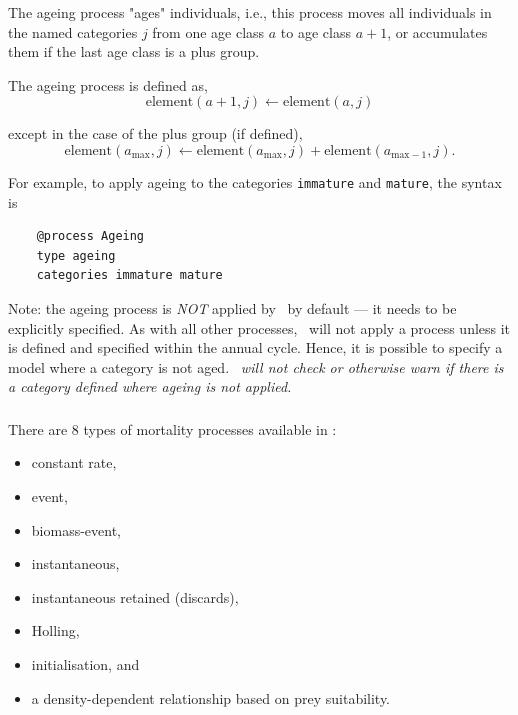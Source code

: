 The ageing process "ages" individuals, i.e., this process moves all individuals in the named categories $j$ from one age class $a$ to age class $a + 1$, or accumulates them if the last age class is a plus group.

The ageing process is defined as,
\begin{equation}
  \text{element}(a + 1,j) \leftarrow \text{element}(a,j)
\end{equation}

except in the case of the plus group (if defined),
\begin{equation}
  \text{element}(a_{\text{max}}, j) \leftarrow \text{element}(a_{\text{max}}, j) + \text{element}(a_{\text{max}-1}, j).
\end{equation}

For example, to apply ageing to the categories \texttt{immature} and \texttt{mature}, the syntax is

{\small{\begin{verbatim}
	@process Ageing
	type ageing
	categories immature mature
	\end{verbatim}}}

Note: the ageing process is \emph{NOT} applied by \CNAME\ by default --- it needs to be explicitly specified. As with all other processes, \CNAME\ will not apply a process unless it is defined and specified within the annual cycle. Hence, it is possible to specify a model where a category is not aged. \emph{\CNAME\ will not check or otherwise warn if there is a category defined where ageing is not applied.}

\subsubsection{\label{sec:Process-Mortality}}

There are 8 types of mortality processes available in \CNAME:

\begin{itemize}
	\item constant rate,
	\item event,
	\item biomass-event,
	\item instantaneous,
	\item instantaneous retained (discards),
	\item Holling,
	\item initialisation, and
	\item a density-dependent relationship based on prey suitability.
\end{itemize}

